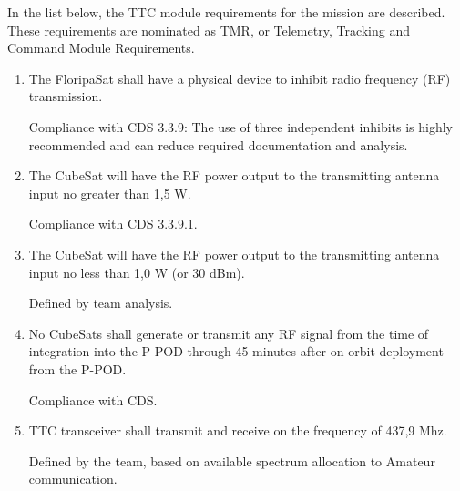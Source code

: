 \documentclass[12pt]{book}
\begin{document}
In the list below, the TTC module requirements for the mission are described. These requirements are nominated as TMR, or Telemetry, Tracking and Command Module Requirements.

\begin{enumerate}[label=\textit{TMR \arabic*}, leftmargin=*, align=left]
	\item The FloripaSat shall have a physical device to inhibit radio frequency (RF) transmission.
	
	\begin{footnotesize}
		Compliance with CDS 3.3.9: The use of three independent inhibits is highly recommended and can reduce required documentation and analysis.	
	\end{footnotesize}
	
	\item The CubeSat will have the RF power output to the transmitting antenna input no greater than 1,5 W.
	
	\begin{footnotesize}
		Compliance with CDS 3.3.9.1.
	\end{footnotesize}
	
	\item The CubeSat will have the RF power output to the transmitting antenna input no less than 1,0 W (or 30 dBm).
	
	\begin{footnotesize}
		Defined by team analysis.
	\end{footnotesize}
	\item No CubeSats shall generate or transmit any RF signal from the time of integration into the P-POD through 45 minutes after on-orbit deployment from the P-POD.
	
	\begin{footnotesize}
		Compliance with CDS.
	\end{footnotesize}
	
	\item TTC transceiver shall transmit and receive on the frequency of 437,9 Mhz.
	
	\begin{footnotesize}
		Defined by the team, based on available spectrum allocation to Amateur communication.
	\end{footnotesize}
	

\end{enumerate}
\end{document}
